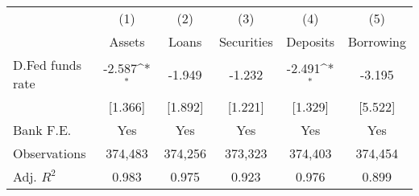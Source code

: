 {
\def\sym#1{\ifmmode^{#1}\else\(^{#1}\)\fi}
\begin{tabular*}{\hsize}{@{\hskip\tabcolsep\extracolsep\fill}l*{5}{c}}
\hline\hline
                    &\multicolumn{1}{c}{(1)}&\multicolumn{1}{c}{(2)}&\multicolumn{1}{c}{(3)}&\multicolumn{1}{c}{(4)}&\multicolumn{1}{c}{(5)}\\
                    &\multicolumn{1}{c}{Assets}&\multicolumn{1}{c}{Loans}&\multicolumn{1}{c}{Securities}&\multicolumn{1}{c}{Deposits}&\multicolumn{1}{c}{Borrowing}\\
\hline
D.Fed funds rate    &      -2.587\sym{*}  &      -1.949         &      -1.232         &      -2.491\sym{*}  &      -3.195         \\
                    &     [1.366]         &     [1.892]         &     [1.221]         &     [1.329]         &     [5.522]         \\
\hline
Bank F.E.           &         Yes         &         Yes         &         Yes         &         Yes         &         Yes         \\
Observations        &     374,483         &     374,256         &     373,323         &     374,403         &     374,454         \\
Adj. \(R^{2}\)      &       0.983         &       0.975         &       0.923         &       0.976         &       0.899         \\
\hline\hline
\end{tabular*}
}
